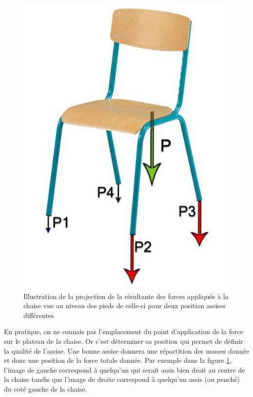 \documentclass{polytech/polytech}
\begin{document}
\begin{figure}[htbp]
\begin{center}
\includegraphics[scale=1]{image/Chaise_forces_hetero.jpg}
\end{center}
\caption{Illustration de la projection de la résultante des forces appliqués à la chaise vue au niveau des pieds de celle-ci pour deux position assises différentes}
\label{fig:illustr_chaise_forces}
\end{figure}

En pratique, on ne connais pas l'emplacement du point d'application de la force sur le plateau de la chaise. Or c'est déterminer sa position qui permet de définir la qualité de l'assise. Une bonne assise donnera une répartition des masses donnée et donc une position de la force totale donnée. Par exemple dans la figure \ref{fig:illustr_chaise_forces}, l'image de gauche correspond à quelqu'un qui serait assis bien droit au centre de la chaise tandis que l'image de droite correspond à quelqu'un assis (ou penché) du coté gauche de la chaise.
\end{document}
